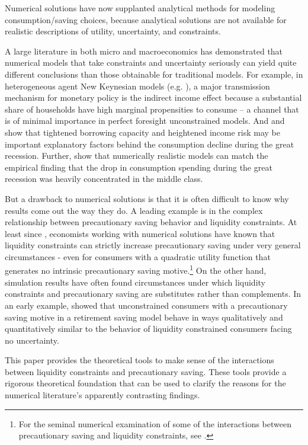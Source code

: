 
  Numerical solutions have now supplanted analytical methods for modeling consumption/saving choices, because analytical solutions are not available for realistic descriptions of utility, uncertainty, and constraints.

  A large literature in both micro and macroeconomics has demonstrated that numerical models that take constraints and uncertainty seriously can yield quite different conclusions than those obtainable for traditional models. For example, in heterogeneous agent New Keynesian models (e.g. \citealp{kmvHANK}), a major transmission mechanism for monetary policy is the indirect income effect because a substantial share of households have high marginal propensities to consume -- a channel that is of minimal importance in perfect foresight unconstrained models. And \citet{glLiq} and \citet{blPrecautionary} show that tightened borrowing capacity and heightened income risk may be important explanatory factors behind the consumption decline during the great recession. Further, \citet{kmpHandbook} show that numerically realistic models can match the empirical finding that the drop in consumption spending during the great recession was heavily concentrated in the middle class.

But a drawback to numerical solutions is that it is often difficult to know why results come out the way they do.  A leading example is in the complex relationship between precautionary saving behavior and liquidity constraints.  At least since \citet{zeldes:thesis}, economists working with numerical solutions have known that liquidity constraints can strictly increase precautionary saving under very general circumstances - even for consumers with a quadratic utility function that generates no intrinsic precautionary saving motive.\footnote{For the seminal numerical examination of some of the interactions between precautionary saving and liquidity constraints, see \citet{deatonLiqConstr}.} On the other hand, simulation results have often found circumstances under which liquidity constraints and precautionary saving are substitutes rather than complements.  In an early example, \citet{samwick:pensions} showed that unconstrained consumers with a precautionary saving motive in a retirement saving model behave in ways qualitatively and quantitatively similar to the behavior of liquidity constrained consumers facing no uncertainty.

This paper provides the theoretical tools to make sense of the interactions between liquidity constraints and precautionary saving. These tools provide a rigorous theoretical foundation that can be used to clarify the reasons for the numerical literature's apparently contrasting findings.


